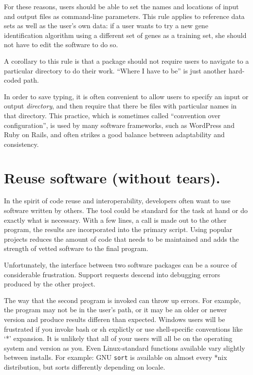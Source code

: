 \documentclass[10pt]{article}
\begin{document}
For these reasons, users should be able to set the names and locations
of input and output files as command-line parameters. This rule applies
to reference data sets as well as the user's own data: if a user wants
to try a new gene identification algorithm using a different set of
genes as a training set, she should not have to edit the software to do
so.

A corollary to this rule is that a package should not require users to
navigate to a particular directory to do their work. ``Where I have to
be'' is just another hard-coded path.

In order to save typing, it is often convenient to allow users to
specify an input or output \emph{directory}, and then require that there
be files with particular names in that directory. This practice, which
is sometimes called ``convention over configuration'', is used by many
software frameworks, such as WordPress and Ruby on Rails, and often
strikes a good balance between adaptability and consistency.

\section{Reuse software (without tears).}

In the spirit of code reuse and interoperability, developers often want
to use software written by others. The tool could be standard for the
task at hand or do exactly what is necessary. With a few lines, a call
is made out to the other program, the results are incorporated into the
primary script. Using popular projects reduces the amount of code that
needs to be maintained and adds the strength of vetted software to the
final program.

Unfortunately, the interface between two software packages can be a
source of considerable frustration. Support requests descend into
debugging errors produced by the other project.

The way that the second program is invoked can throw up errors. For
example, the program may not be in the user's path, or it may be an
older or newer version and produce results differen than expected.
Windows users will be frustrated if you invoke bash or sh explictly or
use shell-specific conventions like `*' expansion. It is unlikely that
all of your users will all be on the operating system and version as
you. Even Linux-standard functions available vary slightly between
installs. For example: GNU \texttt{sort} is available on almost every
*nix distribution, but sorts differently depending on locale.
\end{document}
